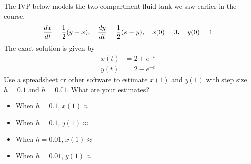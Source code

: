 \documentclass[12pt]{exam}
\begin{document}
\begin{questions}
\question[1] The IVP below models the two-compartment fluid tank we saw earlier in the course. 
\begin{align}
    {\frac{dx}{dt}} = \frac12(y-x) , \quad {\frac{dy}{dt}} = \frac12 (x-y), \quad x(0)=3, \quad y(0) = 1
\end{align}
The exact solution is given by
\begin{align}
    x(t) &= 2 + e^{-t} \\
    y(t) &= 2 - e^{-t}
\end{align}
Use a spreadsheet or other software to estimate $x(1)$ and $y(1)$ with step size $h=0.1$ and $h = 0.01$. What are your estimates? 

\begin{itemize}
    \item When $h=0.1$, $x(1) \approx$ \vspace{12pt}
    \item When $h=0.1$, $y(1) \approx$ \vspace{12pt}
    \item When $h=0.01$, $x(1) \approx$ \vspace{12pt}
    \item When $h=0.01$, $y(1) \approx$
\end{itemize}
\end{questions}
\end{document}
